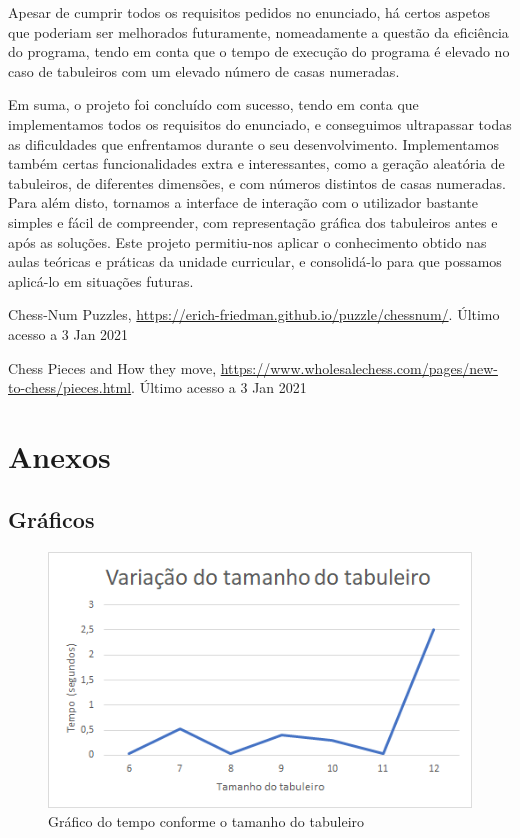 \documentclass[runningheads]{llncs}
\begin{document}
Apesar de cumprir todos os requisitos pedidos no enunciado, há certos aspetos que poderiam ser melhorados futuramente, nomeadamente a questão da eficiência do programa, tendo em conta que o tempo de execução do programa
é elevado no caso de tabuleiros com um elevado número de casas numeradas.

Em suma, o projeto foi concluído com sucesso, tendo em conta que implementamos todos os requisitos do enunciado, e conseguimos ultrapassar todas as dificuldades que enfrentamos durante o seu desenvolvimento.
Implementamos também certas funcionalidades extra e interessantes, como a geração aleatória de tabuleiros, de diferentes dimensões, e com números distintos de casas numeradas. Para além disto, tornamos a interface de interação com o utilizador bastante simples e fácil de compreender,
com representação gráfica dos tabuleiros antes e após as soluções. Este projeto permitiu-nos aplicar o conhecimento obtido nas aulas teóricas e práticas da unidade curricular, e consolidá-lo para que possamos aplicá-lo em situações futuras.

%
%
\newpage
\begin{thebibliography}{8}
Chess-Num Puzzles, \url{https://erich-friedman.github.io/puzzle/chessnum/}. Último acesso a 3
Jan 2021

Chess Pieces and How they move, \url{https://www.wholesalechess.com/pages/new-to-chess/pieces.html}. Último acesso a 3
Jan 2021

\end{thebibliography}

\newpage
\section{Anexos}
\subsection{Gráficos}
\begin{figure}
    \centering
    \includegraphics[scale=0.5]{./images/tamanhotabuleiro.png}
    \caption{Gráfico do tempo conforme o tamanho do tabuleiro} \label{fig1}
\end{figure}
\end{document}
